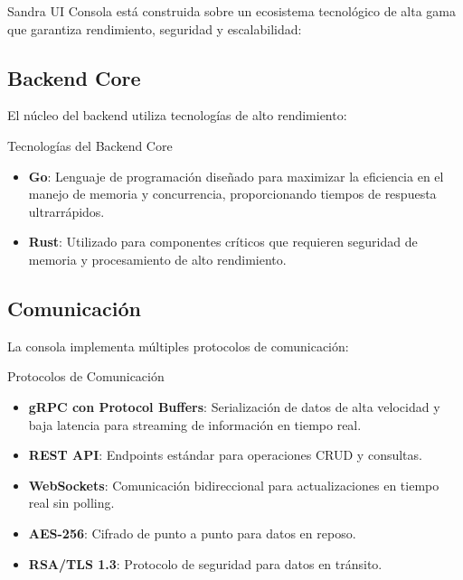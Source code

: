 Sandra UI Consola está construida sobre un ecosistema tecnológico de alta gama que garantiza rendimiento, seguridad y escalabilidad:

\subsection{Backend Core}

El núcleo del backend utiliza tecnologías de alto rendimiento:

\begin{caja}{Tecnologías del Backend Core}
\begin{itemize}
\item \textbf{Go}: Lenguaje de programación diseñado para maximizar la eficiencia en el manejo de memoria y concurrencia, proporcionando tiempos de respuesta ultrarrápidos.
\item \textbf{Rust}: Utilizado para componentes críticos que requieren seguridad de memoria y procesamiento de alto rendimiento.
\end{itemize}
\end{caja}


\subsection{Comunicación}

La consola implementa múltiples protocolos de comunicación:

\begin{caja}{Protocolos de Comunicación}
\begin{itemize}
\item \textbf{gRPC con Protocol Buffers}: Serialización de datos de alta velocidad y baja latencia para streaming de información en tiempo real.
\item \textbf{REST API}: Endpoints estándar para operaciones CRUD y consultas.
\item \textbf{WebSockets}: Comunicación bidireccional para actualizaciones en tiempo real sin polling.
\item \textbf{AES-256}: Cifrado de punto a punto para datos en reposo.
\item \textbf{RSA/TLS 1.3}: Protocolo de seguridad para datos en tránsito.
\end{itemize}
\end{caja}

